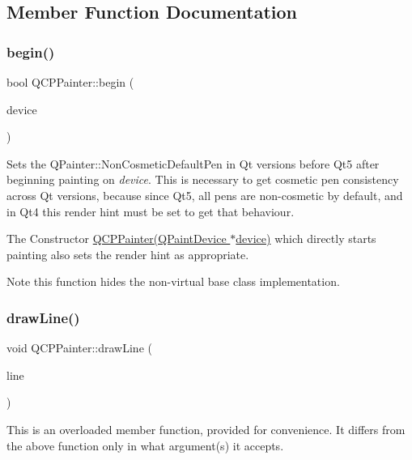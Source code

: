 \subsection{Member Function Documentation}
\mbox{\label{classQCPPainter_a0a41146ccd619dceab6e25ec7b46b044}} 
\subsubsection{\texorpdfstring{begin()}{begin()}}
{\footnotesize\ttfamily bool Q\+C\+P\+Painter\+::begin (\begin{DoxyParamCaption}\item[{Q\+Paint\+Device $\ast$}]{device }\end{DoxyParamCaption})}

Sets the Q\+Painter\+::\+Non\+Cosmetic\+Default\+Pen in Qt versions before Qt5 after beginning painting on {\itshape device}. This is necessary to get cosmetic pen consistency across Qt versions, because since Qt5, all pens are non-\/cosmetic by default, and in Qt4 this render hint must be set to get that behaviour.

The Constructor \hyperlink{classQCPPainter_ae58dbb1795ddc4351ab324dc9898aa22}{Q\+C\+P\+Painter(\+Q\+Paint\+Device $\ast$device)} which directly starts painting also sets the render hint as appropriate.

\begin{DoxyNote}{Note}
this function hides the non-\/virtual base class implementation. 
\end{DoxyNote}
\mbox{\label{classQCPPainter_a0b4b1b9bd495e182c731774dc800e6e0}} 
\subsubsection{\texorpdfstring{draw\+Line()}{drawLine()}}
{\footnotesize\ttfamily void Q\+C\+P\+Painter\+::draw\+Line (\begin{DoxyParamCaption}\item[{const Q\+LineF \&}]{line }\end{DoxyParamCaption})}

This is an overloaded member function, provided for convenience. It differs from the above function only in what argument(s) it accepts.

